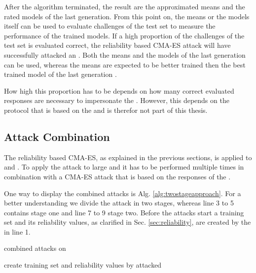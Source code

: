 After the algorithm terminated, the result are the approximated means and the rated models of the last generation.
From this point on, the means or the models itself can be used to evaluate challenges of the test set to measure the performance of the trained models. 
If a high proportion of the challenges of the test set is evaluated correct, the reliability based \ac{CMA-ES} attack will have successfully attacked an \apuf. %
Both the means and the models of the last generation can be used, whereas the means are expected to be better trained then the best trained model of the last generation \cite{Wikipedia2017CMA-ES}.

How high this proportion has to be depends on how many correct evaluated responses are necessary to impersonate the \puf.
However, this depends on the protocol that is based on the \puf and is therefor not part of this thesis.


\subsection{Attack Combination}
\label{sec:attackcombination}

The reliability based \ac{CMA-ES}, as explained in the previous sections, is applied to \apufs and \mpuf.
To apply the attack to large \xpufs and \mxpuf it has to be performed multiple times in combination with a \ac{CMA-ES} attack that is based on the responses of the \puf \cite{Becker2015ThePUFs}.

One way to display the combined attacks is Alg. \ref{alg:twostageapproach}.
For a better understanding we divide the attack in two stages, whereas line 3 to 5 contains stage one and line 7 to 9 stage two.
Before the attacks start a training set and its reliability values, as clarified in Sec. \ref{sec:reliability}, are created by the \xpuf in line 1.

\SetAlCapHSkip{0.2em}
\begin{algorithm}[H] %
\Indm
\SetAlgoLined
\caption{combined attacks on \xpufs}
\label{alg:twostageapproach}
\Indp

create training set and reliability values by attacked \xpuf\\

\end{algorithm}

